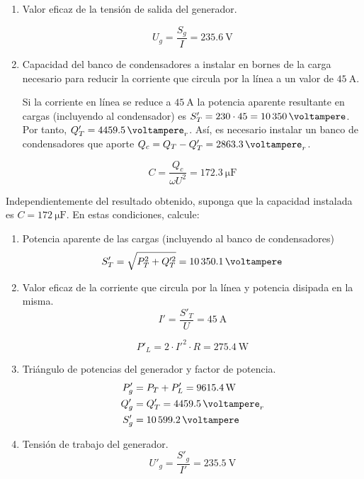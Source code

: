 \documentclass[10pt]{article}
\begin{document}
\begin{enumerate}
\item Valor eficaz de la tensión de salida del generador.

  \[
    U_g = \frac{S_g}{I} = \SI{235.6}{\volt}
  \]

\item Capacidad del banco de condensadores a instalar en bornes de la
  carga necesario para reducir la corriente que circula por la línea a
  un valor de $\SI{45}{\ampere}$.

  Si la corriente en línea se reduce a $\SI{45}{\ampere}$ la potencia
  aparente resultante en cargas (incluyendo al condensador) es
  $S'_T = 230 \cdot 45 = \SI{10350}{\voltampere}$. Por tanto,
  $Q'_T = \SI{4459.5}{\voltampere}_r$. Así, es necesario instalar un
  banco de condensadores que aporte
  $Q_c = Q_T - Q'_T = \SI{2863.3}{\voltampere}_r$.

\[
  C = \frac{Q_c}{\omega U^2} = \SI{172.3}{\micro\farad}
\]

  
\end{enumerate}

Independientemente del resultado obtenido, suponga que la capacidad
instalada es $C = \SI{172}{\micro\farad}$. En estas condiciones,
calcule:
\begin{enumerate}[resume]
\item Potencia aparente de las cargas (incluyendo al banco de
  condensadores)
  \[
    S'_T = \sqrt{P^2_T + Q'^2_T} = \SI{10350.1}{\voltampere}
  \]

\item Valor eficaz de la corriente que circula por la línea y potencia
  disipada en la misma.
  \[
    I' = \frac{S'_T}{U} = \SI{45}{\ampere}
  \]

\[
  P'_L = 2 \cdot I'^2 \cdot R = \SI{275.4}{\watt}
\]

\item Triángulo de potencias del generador y factor de potencia.
  \begin{align*}
    P'_g &= P_T + P'_L = \SI{9615.4}{\watt}\\
    Q'_g &= Q'_T = \SI{4459.5}{\voltampere}_r\\
    S'_g &= \SI{10599.2}{\voltampere}\\    
  \end{align*}

\item Tensión de trabajo del generador.
  \[
    U'_g = \frac{S'_g}{I'} = \SI{235.5}{\volt}
  \]
\end{enumerate}
\end{document}
